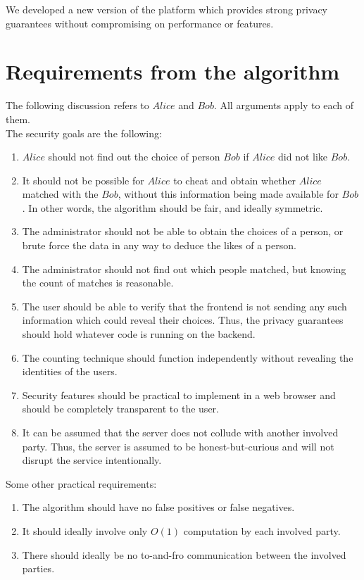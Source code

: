 \documentclass[sigtbd]{sigtbd-style}
\begin{document}
We developed a new version of the platform which provides strong
privacy guarantees without compromising on performance or features.

\section{Requirements from the algorithm}
The following discussion refers to $Alice$ and $Bob$. All
arguments apply to each of them.\\
The security goals are the following:
\begin{enumerate}
\item $Alice$ should not find out the choice of person $Bob$ if $Alice$
  did not like $Bob$.
\item It should not be possible for $Alice$ to cheat and obtain
  whether $Alice$ matched with the $Bob$, without this
  information being made available for $Bob$. In other words, the
  algorithm should be fair, and ideally symmetric.
\item The administrator should not be able to obtain the choices of
  a person, or brute force the data in any way to deduce the likes
  of a person.
\item The administrator should not find out which people matched, but
  knowing the count of matches is reasonable.
\item The user should be able to verify that the frontend is not
  sending any such information which could reveal their
  choices. Thus, the privacy guarantees should hold whatever code is
  running on the backend.
\item The counting technique should function independently without
  revealing the identities of the users.
\item Security features should be practical to implement in a web
  browser and should be completely transparent to the user.
\item It can be assumed that the server does not collude with
  another involved party. Thus, the server is assumed to be
  honest-but-curious and will not disrupt the service intentionally.
\end{enumerate}
Some other practical requirements:
\begin{enumerate}
\item The algorithm should have no false positives or false negatives.
\item It should ideally involve only $O(1)$ computation by each
  involved party.
\item There should ideally be no to-and-fro communication between the
  involved parties.
\end{enumerate}
\end{document}
